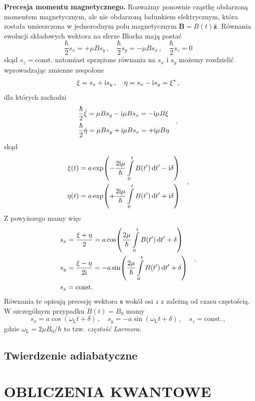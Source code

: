 \documentclass{myclass}
\begin{document}
\linesep

\textbf{Precesja momentu magnetycznego.} Rozważmy ponownie cząstkę obdarzoną momentem magnetycznym,
ale nie obdarzoną ładunkiem elektrycznym, która została umieszczona w jednorodnym polu magnetycznym
\(\mathbf{B} = B(t)\mathbf{\hat{z}}\). Równania ewolucji składowych wektora na sferze Blocha mają
postać
\begin{equation*}
    \frac{\hbar}{2}\dot{s}_x = +\mu B s_y\,,\quad \frac{\hbar}{2}\dot{s}_y = -\mu Bs_x\,,\quad \frac{\hbar}{2}\dot{s}_z = 0
\end{equation*}
skąd \(s_z = \text{const.}\) natomiast sprzężone równania na \(s_x\) i \(s_y\) możemy rozdzielić
wprowadzając zmienne zespolone
\begin{equation*}
    \xi = s_x + \mathrm{i} s_y\,,\quad \eta = s_x - \mathrm{i} s_y = \xi^*\,,
\end{equation*}
dla których zachodzi
\begin{equation*}
    \begin{split}
        &\frac{\hbar}{2}\dot{\xi} = \mu B s_y - \mathrm{i} \mu B s_x = -\mathrm{i} \mu B \xi\\
        &\frac{\hbar}{2}\dot{\eta} = \mu B s_y + \mathrm{i} \mu B s_x = +\mathrm{i} \mu B \eta
    \end{split}\quad,
\end{equation*}
skąd
\begin{equation*}
    \begin{split}
        \xi(t) = a\exp(-\frac{2\mathrm{i}\mu}{\hbar}\int\limits_0^tB(t')\dd{t'} - \mathrm{i}\delta)\\
        \eta(t) = a\exp(+\frac{2\mathrm{i}\mu}{\hbar}\int\limits_0^tB(t')\dd{t'} + \mathrm{i}\delta)
    \end{split}\quad,
\end{equation*}
Z powyższego mamy więc
\begin{equation*}
    \begin{split}
        &s_x = \frac{\xi + \eta}{2} = a \cos(\frac{2\mu}{\hbar}\int\limits_0^tB(t')\dd{t'} + \delta)\\
        &s_y = \frac{\xi - \eta}{2\mathrm{i}} = -a\sin(\frac{2\mu}{\hbar}\int\limits_0^tB(t')\dd{t'} + \delta)\\
        &s_z = \text{const.}
    \end{split}\quad.
\end{equation*}
Równania te opisują precesję wektora \(\mathbf{s}\) wokół osi \(z\) z zależną od czasu częstością. W
szczególnym przypadku \(B(t) = B_0\) mamy
\begin{equation*}
    s_x = a\cos(\omega_\text{L}t + \delta)\,,\quad s_y = -a\sin(\omega_\text{L}t + \delta)\,,\quad s_z=\text{const.}\,,
\end{equation*}
gdzie \(\boxed{\omega_\text{L} = 2\mu B_0/\hbar }\) to tzw. \textit{częstość Larmora}.

\subsection{Twierdzenie adiabatyczne}

\newpage
\section{OBLICZENIA KWANTOWE}
\end{document}

